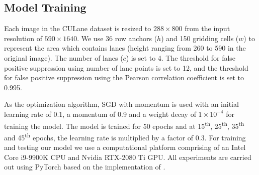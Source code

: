 \documentclass[conference]{IEEEtran}
\begin{document}
\subsection{Model Training}
\label{ssec:imp_details}

Each image in the CULane dataset is resized to $288 \times 800$ from the input resolution of $590 \times 1640$. We use 36 row anchors ($h$) and 150 gridding cells ($w$) to represent the area which contains lanes (height ranging from 260 to 590 in the original image). The number of lanes ($c$) is set to 4. The threshold for false positive suppression using number of lane points is set to 12, and the threshold for false positive suppression using the Pearson correlation coefficient is set to 0.995.

As the optimization algorithm, SGD with momentum \cite{pmlr-v28-sutskever13} is used with an initial learning rate of 0.1, a momentum of 0.9 and a weight decay of $1 \times 10^{-4}$ for training the model. The model is trained for 50 epochs and at 15\textsuperscript{th}, 25\textsuperscript{th}, 35\textsuperscript{th} and 45\textsuperscript{th} epochs, the learning rate is multiplied by a factor of 0.3. For training and testing our model we use a computational platform comprising of an Intel Core i9-9900K CPU and Nvidia RTX-2080 Ti GPU. All experiments are carried out using PyTorch\cite{paszke2017automatic} based on the implementation of \cite{qin2020ultra}.
\end{document}
